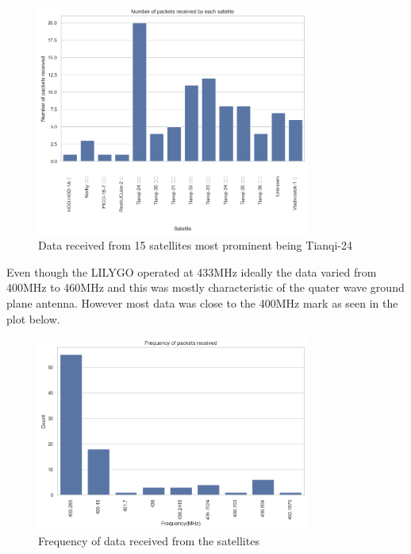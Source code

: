 \documentclass[12pt,a4paper]{article}
\begin{document}
\begin{figure}[h]
    \centering
    \includegraphics[width=0.8\textwidth]{../images/satelites.png}
    \caption{Data received from 15 satellites most prominent being Tianqi-24}
    \label{fig:received_data}
\end{figure}
Even though the LILYGO operated at 433MHz ideally the data varied from 400MHz to 460MHz and this was mostly characteristic of the quater wave ground plane antenna. However most data was close to the 400MHz mark as seen in the plot below.
\begin{figure}[H]
    \centering
    \includegraphics[width=0.8\textwidth]{../images/frequencies.png}
    \caption{Frequency of data received from the satellites}
    \label{fig:frequency_data}
\end{figure}
\end{document}

